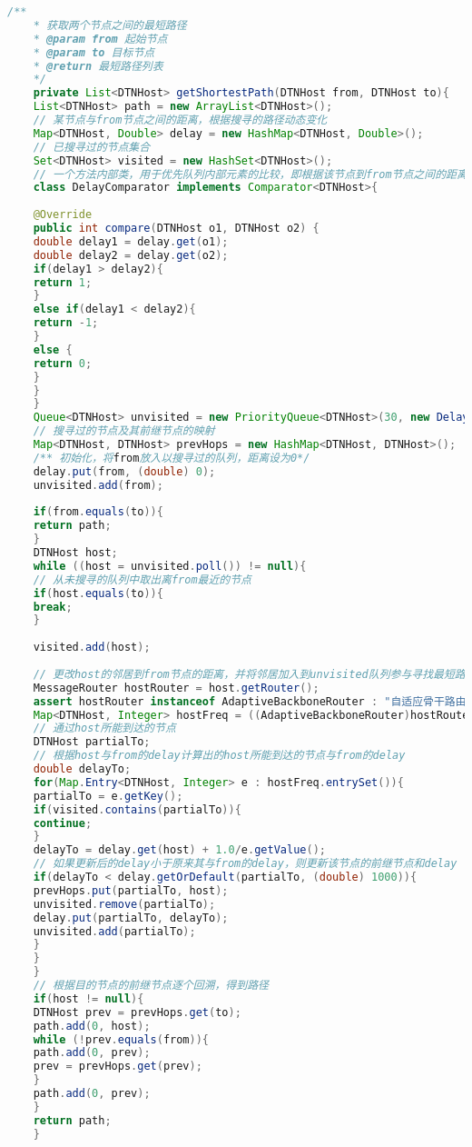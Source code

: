 \documentclass[lang=cn,11pt]{elegantpaper}
\begin{document}
	\begin{lstlisting}[language=Java]
	/**
	* 获取两个节点之间的最短路径
	* @param from 起始节点
	* @param to 目标节点
	* @return 最短路径列表
	*/
	private List<DTNHost> getShortestPath(DTNHost from, DTNHost to){
	List<DTNHost> path = new ArrayList<DTNHost>();
	// 某节点与from节点之间的距离，根据搜寻的路径动态变化
	Map<DTNHost, Double> delay = new HashMap<DTNHost, Double>();
	// 已搜寻过的节点集合
	Set<DTNHost> visited = new HashSet<DTNHost>();
	// 一个方法内部类，用于优先队列内部元素的比较，即根据该节点到from节点之间的距离比较
	class DelayComparator implements Comparator<DTNHost>{
	
	@Override
	public int compare(DTNHost o1, DTNHost o2) {
	double delay1 = delay.get(o1);
	double delay2 = delay.get(o2);
	if(delay1 > delay2){
	return 1;
	}
	else if(delay1 < delay2){
	return -1;
	}
	else {
	return 0;
	}
	}
	}
	Queue<DTNHost> unvisited = new PriorityQueue<DTNHost>(30, new DelayComparator());
	// 搜寻过的节点及其前继节点的映射
	Map<DTNHost, DTNHost> prevHops = new HashMap<DTNHost, DTNHost>();
	/** 初始化，将from放入以搜寻过的队列，距离设为0*/
	delay.put(from, (double) 0);
	unvisited.add(from);
	
	if(from.equals(to)){
	return path;
	}
	DTNHost host;
	while ((host = unvisited.poll()) != null){
	// 从未搜寻的队列中取出离from最近的节点
	if(host.equals(to)){
	break;
	}
	
	visited.add(host);
	
	// 更改host的邻居到from节点的距离，并将邻居加入到unvisited队列参与寻找最短路径
	MessageRouter hostRouter = host.getRouter();
	assert hostRouter instanceof AdaptiveBackboneRouter : "自适应骨干路由只适用于相同的路由协议";
	Map<DTNHost, Integer> hostFreq = ((AdaptiveBackboneRouter)hostRouter).freq;
	// 通过host所能到达的节点
	DTNHost partialTo;
	// 根据host与from的delay计算出的host所能到达的节点与from的delay
	double delayTo;
	for(Map.Entry<DTNHost, Integer> e : hostFreq.entrySet()){
	partialTo = e.getKey();
	if(visited.contains(partialTo)){
	continue;
	}
	delayTo = delay.get(host) + 1.0/e.getValue();
	// 如果更新后的delay小于原来其与from的delay，则更新该节点的前继节点和delay
	if(delayTo < delay.getOrDefault(partialTo, (double) 1000)){
	prevHops.put(partialTo, host);
	unvisited.remove(partialTo);
	delay.put(partialTo, delayTo);
	unvisited.add(partialTo);
	}
	}
	}
	// 根据目的节点的前继节点逐个回溯，得到路径
	if(host != null){
	DTNHost prev = prevHops.get(to);
	path.add(0, host);
	while (!prev.equals(from)){
	path.add(0, prev);
	prev = prevHops.get(prev);
	}
	path.add(0, prev);
	}
	return path;
	}
	\end{lstlisting}
	
\end{document}
